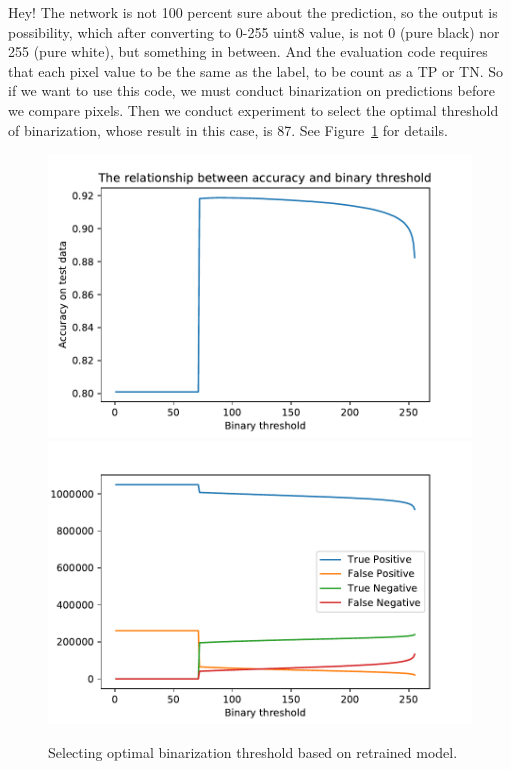 Hey! The network is not 100 percent sure about the prediction, so the output is possibility, which after converting to 0-255 uint8 value, is not 0 (pure black) nor 255 (pure white), but something in between. And the evaluation code requires that each pixel value to be the same as the label, to be count as a TP or TN. So if we want to use this code, we must conduct binarization on predictions before we compare pixels. Then we conduct experiment to select the optimal threshold of binarization, whose result in this case, is 87. See Figure~\ref{fig:unetthre} for details.
\begin{figure}[htpb]
    \centering
    \includegraphics[scale=0.5]{figuras/unet_acc_thre.pdf}
    \includegraphics[scale=0.5]{figuras/unet_verbose_thre.pdf}
    \caption{Selecting optimal binarization threshold based on retrained model.}\label{fig:unetthre}
\end{figure}

